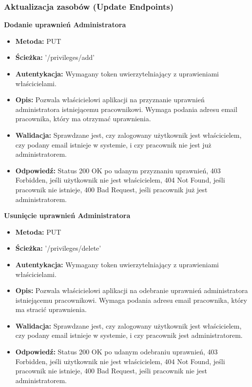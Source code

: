 \subsubsection{Aktualizacja zasobów (Update Endpoints)}
\textbf{\large{Dodanie uprawnień Administratora}}
\begin{itemize}
    \item \textbf{Metoda:} PUT
    \item \textbf{Ścieżka:} '/privileges/add'
    \item \textbf{Autentykacja:} Wymagany token uwierzytelniający z uprawieniami właścicielami.
    \item \textbf{Opis:} Pozwala właścicielowi aplikacji na przyznanie uprawnień administratora istniejącemu pracownikowi. Wymaga podania adresu email pracownika, który ma otrzymać uprawnienia.
    \item \textbf{Walidacja:}  Sprawdzane jest, czy zalogowany użytkownik jest właścicielem, czy podany email istnieje w systemie, i czy pracownik nie jest już administratorem.
    \item \textbf{Odpowiedź:}  Status 200 OK po udanym przyznaniu uprawnień, 403 Forbidden, jeśli użytkownik nie jest właścicielem, 404 Not Found, jeśli pracownik nie istnieje, 400 Bad Request, jeśli pracownik już jest administratorem.
\end{itemize}

\textbf{\large{Usunięcie uprawnień Administratora}}
\begin{itemize}
    \item \textbf{Metoda:} PUT
    \item \textbf{Ścieżka:} '/privileges/delete'
    \item \textbf{Autentykacja:} Wymagany token uwierzytelniający z uprawieniami właścicielami.
    \item \textbf{Opis:} Pozwala właścicielowi aplikacji na odebranie uprawnień administratora istniejącemu pracownikowi. Wymaga podania adresu email pracownika, który ma stracić uprawnienia.
    \item \textbf{Walidacja:}  Sprawdzane jest, czy zalogowany użytkownik jest właścicielem, czy podany email istnieje w systemie, i czy pracownik jest administratorem.
    \item \textbf{Odpowiedź:}  Status 200 OK po udanym odebraniu uprawnień, 403 Forbidden, jeśli użytkownik nie jest właścicielem, 404 Not Found, jeśli pracownik nie istnieje, 400 Bad Request, jeśli pracownik nie jest administratorem.
\end{itemize}

